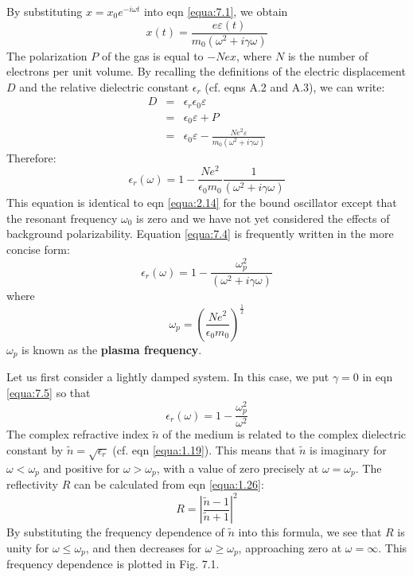 \documentclass[12pt]{book}
\begin{document}
{By substituting $x = x_0e^{-i\omega t}$ into eqn \ref{equa:7.1}, we obtain
\begin{equation}\label{equa:7.2}
  x(t)=\frac{e\varepsilon(t)}{m_0(\omega^2+i\gamma\omega)}
\end{equation}
The polarization $P$ of the gas is equal to $-Nex$, where $N$ is the number of electrons per unit volume. By recalling the definitions of the electric displacement $D$ and the relative dielectric constant $\epsilon_r$ (cf. eqns A.2 and A.3), we can write:
\begin{eqnarray}
\nonumber  D &=& \epsilon_r\epsilon_0\varepsilon \\
\nonumber  &=& \epsilon_0\varepsilon+P \\
   &=& \epsilon_0\varepsilon-\frac{Ne^2\varepsilon}{m_0(\omega^2+i\gamma\omega) }  \label{equa:7.3}
\end{eqnarray}
Therefore:
\begin{equation}\label{equa:7.4}
  \epsilon_r(\omega)=1-\frac{Ne^2}{\epsilon_0m_0}\frac{1}{(\omega^2+i\gamma\omega)}
\end{equation}
This equation is identical to eqn \ref{equa:2.14} for the bound oscillator except that the resonant frequency $\omega_0$ is zero and we have not yet considered the effects of background polarizability. Equation \ref{equa:7.4} is frequently written in the more concise form:
\begin{equation}\label{equa:7.5}
  \epsilon_r(\omega)=1-\frac{\omega_p^2}{(\omega^2+i\gamma\omega)}
\end{equation}
where
\begin{equation}\label{equa:7.6}
  \omega_p=\left(\frac{Ne^2}{\epsilon_0m_0}\right)^{\frac{1}{2}}
\end{equation}
$\omega_p$ is known as the \textbf{plasma frequency}.

Let us first consider a lightly damped system. In this case, we put $\gamma = 0$ in eqn \ref{equa:7.5} so that
\begin{equation}\label{equa:7.7}
  \epsilon_r(\omega)=1-\frac{\omega_p^2}{\omega^2}
\end{equation}
The complex refractive index $\tilde{n}$ of the medium is related to the complex dielectric constant by $\tilde{n} = \sqrt{\epsilon_r}$ (cf. eqn \ref{equa:1.19}). This means that $\tilde{n}$ is imaginary for $\omega <\omega_p$ and positive for $\omega > \omega_p$, with a value of zero precisely at $\omega = \omega_p$. The reflectivity $R$ can be calculated from eqn \ref{equa:1.26}:
\begin{equation}\label{equa:7.8}
  R=|\frac{\tilde{n}-1}{\tilde{n}+1}|^2
\end{equation}
By substituting the frequency dependence of $\tilde{n}$ into this formula, we see that $R$ is unity for $\omega\le\omega_p$, and then decreases for $\omega\ge\omega_p$, approaching zero at $\omega=\infty$. This frequency dependence is plotted in Fig. 7.1.

}
\end{document}
